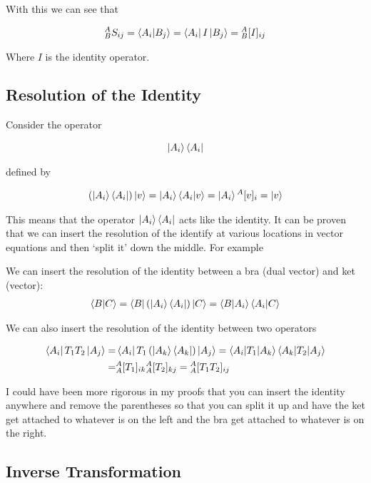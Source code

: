 \documentclass[12pt]{article}
\begin{document}
With this we can see that

\begin{align}
{^A_B S_{ij}} = \braket{A_i | B_j} = \bra{A_i}I\ket{B_j} =  {^A_B [I]_{ij}}
\end{align}

Where $I$ is the identity operator.

\subsection{Resolution of the Identity}

Consider the operator

\begin{align}
\ket{A_i}\bra{A_i}
\end{align}

defined by

\begin{align}
(\ket{A_i}\bra{A_i})\ket{v} = \ket{A_i}\braket{A_i|v} = \ket{A_i} {^A[v]_i} = \ket{v}
\end{align}

This means that the operator $\ket{A_i}\bra{A_i}$ acts like the identity.
It can be proven that we can insert the resolution of the identify at various locations in vector equations and then `split it' down the middle.
For example

We can insert the resolution of the identity between a bra (dual vector) and ket (vector):
\begin{align}
\braket{B|C} = \bra{B}\left(\ket{A_i}\bra{A_i}\right) \ket{C} = \braket{B|A_i}\braket{A_i|C}
\end{align}

We can also insert the resolution of the identity between two operators

\begin{align}
\bra{A_i}T_1T_2\ket{A_j} =& \bra{A_i}T_1\left(\ket{A_k}\bra{A_k}\right) \ket{A_j} = \braket{A_i | T_1 | A_k}\braket{A_k | T_2 | A_j}\\
=& {^A_A [T_1]_{ik}}{^A_A[T_2]_{kj}} = {^A_A[T_1 T_2]_{ij}}
\end{align}

I could have been more rigorous in my proofs that you can insert the identity anywhere and remove the parentheses so that you can split it up and have the ket get attached to whatever is on the left and the bra get attached to whatever is on the right.

\subsection{Inverse Transformation}
\end{document}
